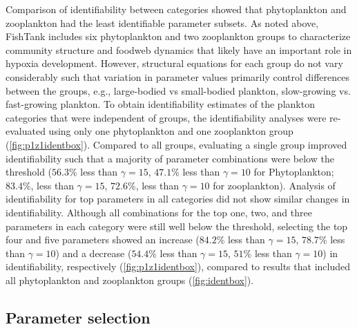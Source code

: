 \documentclass[letterpaper,12pt,oneside]{article}\usepackage[]{graphicx}\usepackage[]{color}
\begin{document}
Comparison of identifiability between categories showed that phytoplankton and zooplankton had the least identifiable parameter subsets.  As noted above, FishTank includes six phytoplankton and two zooplankton groups to characterize community structure and foodweb dynamics that likely have an important role in hypoxia development.  However, structural equations for each group do not vary considerably such that variation in parameter values primarily control differences between the groups, e.g., large-bodied vs small-bodied plankton, slow-growing vs. fast-growing plankton.  To obtain identifiability estimates of the plankton categories that were independent of groups, the identifiability analyses were re-evaluated using only one phytoplankton and one zooplankton group (\cref{fig:p1z1identbox}). Compared to all groups, evaluating a single group improved identifiability such that a majority of parameter combinations were below the threshold ($56.3$\% less than $\gamma = 15$, $47.1$\% less than $\gamma = 10$ for Phytoplankton; $83.4$\%, less than $\gamma = 15$, $72.6$\%, less than $\gamma = 10$ for zooplankton).  Analysis of identifiability for top parameters in all categories did not show similar changes in identifiability.  Although all combinations for the top one, two, and three parameters in each category were still well below the threshold, selecting the top four and five parameters showed an increase ($84.2$\% less than $\gamma = 15$, $78.7$\% less than $\gamma = 10$) and a decrease ($54.4$\% less than $\gamma = 15$, $51$\% less than $\gamma = 10$) in identifiability, respectively (\cref{fig:p1z1identbox}), compared to results that included all phytoplankton and zooplankton groups (\cref{fig:identbox}).  

\subsection{Parameter selection}
\end{document}
